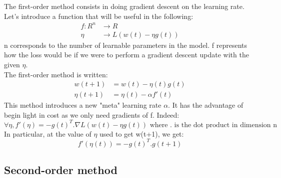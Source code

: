 \documentclass{article}
\begin{document}
  The first-order method consists in doing gradient descent on the learning rate. Let's introduce a function that will be useful in the following:\\
  \begin{align}
  f : R^{n} &\rightarrow R\\
  \eta &\rightarrow L(w(t)-\eta g(t))
  \end{align}
  n corresponds to the number of learnable parameters in the model. f represents how the loss would be if we were to perform a gradient descent update with the given $\eta$.\\
  The first-order method is written:\\
  \begin{align}
  w(t+1) &= w(t) -\eta(t)g(t)\\
  \eta(t+1) &= \eta(t) - \alpha f'(t)
  \end{align} 
  This method introduces a new "meta" learning rate $\alpha$. It has the advantage of begin light in cost as we only need gradients of f. Indeed:\\
  \begin{equation}
  \forall \eta, f'(\eta) = -g(t)^{T}.\nabla L(w(t)-\eta g(t)) \text{ where . is the dot product in dimension n}
  \end{equation}
  In particular, at the value of $\eta$ used to get w(t+1), we get:\\
  \begin{equation}
  f'(\eta(t)) = -g(t)^{T}.g(t+1)
  \end{equation}
  
  \subsection{Second-order method}
  
\end{document}
